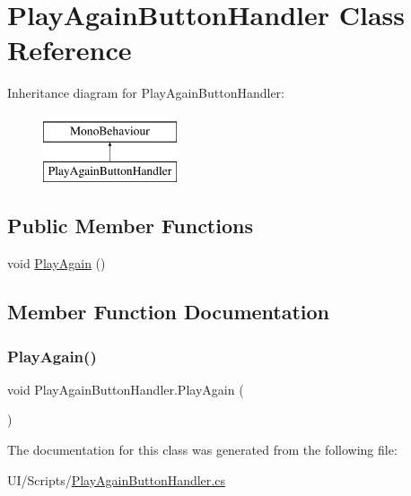 \hypertarget{class_play_again_button_handler}{}\section{Play\+Again\+Button\+Handler Class Reference}
\label{class_play_again_button_handler}
Inheritance diagram for Play\+Again\+Button\+Handler\+:\begin{figure}[H]
\begin{center}
\leavevmode
\includegraphics[height=2.000000cm]{class_play_again_button_handler}
\end{center}
\end{figure}
\subsection*{Public Member Functions}
\begin{DoxyCompactItemize}
\item 
void \mbox{\hyperlink{class_play_again_button_handler_aa182f3c23e4ab315c9bc690a9e87a94f}{Play\+Again}} ()
\end{DoxyCompactItemize}


\subsection{Member Function Documentation}
\mbox{\label{class_play_again_button_handler_aa182f3c23e4ab315c9bc690a9e87a94f}} 
\subsubsection{\texorpdfstring{Play\+Again()}{PlayAgain()}}
{\footnotesize\ttfamily void Play\+Again\+Button\+Handler.\+Play\+Again (\begin{DoxyParamCaption}{ }\end{DoxyParamCaption})}



The documentation for this class was generated from the following file\+:\begin{DoxyCompactItemize}
\item 
U\+I/\+Scripts/\mbox{\hyperlink{_play_again_button_handler_8cs}{Play\+Again\+Button\+Handler.\+cs}}\end{DoxyCompactItemize}
